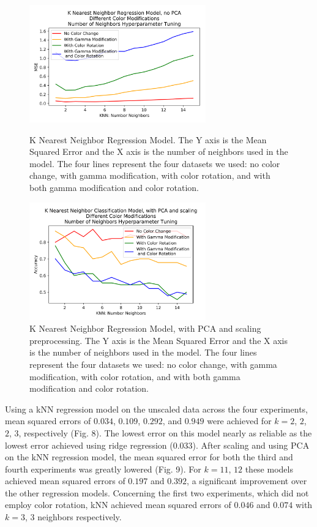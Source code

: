 \documentclass[journal]{IEEEtran}
\begin{document}
\begin{figure}
\centering
\includegraphics[height=2in]{KNN_reg_noPCA/knn_regression.png}
\caption{K Nearest Neighbor Regression Model. The Y axis is the Mean Squared Error and the X axis is the number of neighbors used in the model. The four lines represent the four datasets we used: no color change, with gamma modification, with color rotation, and with both gamma modification and color rotation.}
\label{Rknn}

\centering
\includegraphics[height=2in]{KNN_clf_PCA/knn_classification.png}
\caption{K Nearest Neighbor Regression Model, with PCA and scaling preprocessing. The Y axis is the Mean Squared Error and the X axis is the number of neighbors used in the model. The four lines represent the four datasets we used: no color change, with gamma modification, with color rotation, and with both gamma modification and color rotation.}
\label{Rknn_pca}
\end{figure}

Using a kNN regression model on the unscaled data across the four experiments, mean squared errors of $0.034$, $0.109$, $0.292$, and $0.949$ were achieved for $k=2$, $2$, $2$, $3$, respectively (Fig. 8). The lowest error on this model nearly as reliable as the lowest error achieved using ridge regression ($0.033$). After scaling and using PCA on the kNN regression model, the mean squared error for both the third and fourth experiments was greatly lowered (Fig. 9). For $k=11$, $12$ these models achieved mean squared errors of $0.197$ and $0.392$, a significant improvement over the other regression models. Concerning the first two experiments, which did not employ color rotation, kNN achieved mean squared errors of $0.046$ and $0.074$ with $k=3$, $3$ neighbors respectively.
\end{document}
